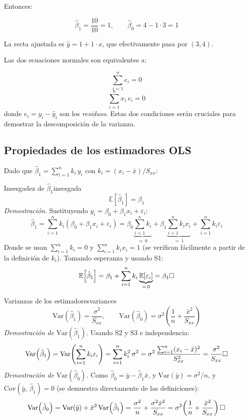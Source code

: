 \documentclass[12pt, a4paper]{article}
\newcommand{\E}[1]{\mathbb{E}\!\left[#1\right]}
\newcommand{\Var}[1]{\mathrm{Var}\!\left(#1\right)}
\newcommand{\Cov}[2]{\mathrm{Cov}\!\left(#1,\,#2\right)}
\newcommand{\hbeta}{\hat{\beta}}
\newcommand{\hy}{\hat{y}}
\newcommand{\sxx}{S_{xx}}
\newcommand{\sumni}{\sum_{i=1}^{n}}
\begin{document}
Entonces:

\[
\hat{\beta}_1 = \frac{10}{10} = 1, \qquad \hat{\beta}_0 = 4 - 1 \cdot 3 = 1
\]

La recta ajustada es $\hat{y} = 1 + 1 \cdot x$, que efectivamente pasa por $(3, 4)$.

\begin{observacion}{}{}
Las dos ecuaciones normales son equivalentes a:

\begin{equation}\label{eq:ec1}
  \sumni e_i = 0
  \tag{EN1}
\end{equation}
\begin{equation}\label{eq:ec2}
  \sumni x_i\,e_i = 0
  \tag{EN2}
\end{equation}
donde $e_i = y_i - \hy_i$ son los \emph{residuos}. Estas dos condiciones serán cruciales para demostrar la descomposición de la varianza.
\end{observacion}

\subsection{Propiedades de los estimadores OLS}

Dado que $\hbeta_1 = \sumni k_i\,y_i$ con $k_i = (x_i-\bar{x})/\sxx$:

\begin{proposicion}{Insesgadez de $\hbeta_1$}{insesgada}
\[
  \E{\hbeta_1} = \beta_1
\]
\textit{Demostración.}
Sustituyendo $y_i = \beta_0 + \beta_1 x_i + \varepsilon_i$:
\[
  \hbeta_1
    = \sumni k_i(\beta_0 + \beta_1 x_i + \varepsilon_i)
    = \beta_0\underbrace{\sumni k_i}_{=\,0}
    + \beta_1\underbrace{\sumni k_i x_i}_{=\,1}
    + \sumni k_i\varepsilon_i
\]
Donde se usan $\sumni k_i = 0$ y $\sumni k_i x_i = 1$ (se verifican fácilmente
 a partir de la definición de $k_i$). Tomando esperanza y usando S1:
\[
  \E{\hbeta_1} = \beta_1 + \sumni k_i\underbrace{\E{\varepsilon_i}}_{=\,0} = \beta_1
  \hfill\square
\]
\end{proposicion}

\begin{proposicion}{Varianzas de los estimadores}{variances}
\[
  \Var{\hbeta_1} = \frac{\sigma^2}{\sxx},
  \qquad
  \Var{\hbeta_0} = \sigma^2\left(\frac{1}{n} + \frac{\bar{x}^2}{\sxx}\right)
\]
\textit{Demostración de $\Var{\hbeta_1}$.} Usando S2 y S3 e independencia:
\[
  \Var{\hbeta_1}
    = \Var{\sumni k_i\varepsilon_i}
    = \sumni k_i^2\,\sigma^2
    = \sigma^2\,\frac{\sumni(x_i-\bar{x})^2}{\sxx^2}
    = \frac{\sigma^2}{\sxx}
    \hfill\square
\]
\textit{Demostración de $\Var{\hbeta_0}$.}
Como $\hbeta_0 = \bar{y} - \hbeta_1\bar{x}$, y
$\Var{\bar{y}} = \sigma^2/n$, y $\Cov{\bar{y}}{\hbeta_1} = 0$
(se demuestra directamente de las definiciones):
\[
  \Var{\hbeta_0}
    = \Var{\bar{y}} + \bar{x}^2\,\Var{\hbeta_1}
    = \frac{\sigma^2}{n} + \frac{\sigma^2\bar{x}^2}{\sxx}
    = \sigma^2\!\left(\frac{1}{n} + \frac{\bar{x}^2}{\sxx}\right)
    \hfill\square
\]
\end{proposicion}
\end{document}
